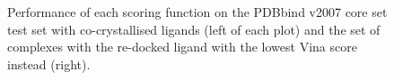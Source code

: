 \begin{figure}
\centering
{}
\caption{Performance of each scoring function on the PDBbind v2007 core set test set with co-crystallised ligands (left of each plot) and the set of complexes with the re-docked ligand with the lowest Vina score instead (right).}
\label{rfscore4:set-1-pdbbind-2007-trn-2}
\end{figure}

